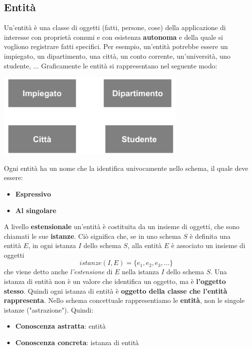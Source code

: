 \documentclass[12pt]{article}
\begin{document}
\subsection{Entità}
Un'entità è una classe di oggetti (fatti, persone, cose) della applicazione di interesse con proprietà comuni e con esistenza \textbf{autonoma} e della quale si vogliono registrare fatti specifici.
Per esempio, un'entità potrebbe essere un impiegato, un dipartimento, una città, un conto corrente, un'università, uno studente, ...
Graficamente le entità si rappresentano nel seguente modo:
\begin{center}
    \includegraphics[width = 0.70\textwidth]{Images/16.PNG}
\end{center}
Ogni entità ha un nome che la identifica univocamente nello schema, il quale deve essere:
\begin{itemize}
    \item \textbf{Espressivo}
    \item \textbf{Al singolare}
\end{itemize}
A livello \textbf{estensionale} un'entità è costituita da un insieme di oggetti, che sono chiamati le sue \textbf{istanze}.
Ciò significa che, se in uno schema $S$ è definita una entità $E$, in ogni istanza $I$ dello schema $S$, alla entità $E$ è associato un insieme di oggetti
$$istanze(I,E) = \{e_1, e_2, e_3, \dots\}$$
che viene detto anche \textit{l'estensione} di $E$ nella istanza $I$ dello schema $S$.
Una istanza di entità non è un valore che identifica un oggetto, ma è \textbf{l'oggetto stesso}.
Quindi ogni istanza di entità è \textbf{oggetto della classe che l'entità rappresenta}.
Nello schema concettuale rappresentiamo le \textbf{entità}, non le singole istanze ("astrazione").
Quindi:
\begin{itemize}
    \item \textbf{Conoscenza astratta}: entità
    \item \textbf{Conoscenza concreta}: istanza di entità
\end{itemize}
\end{document}
